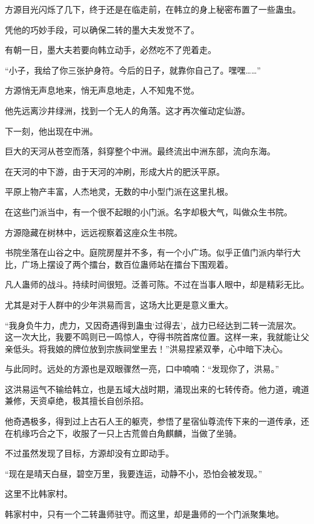 \begin{this_body}
方源目光闪烁了几下，终于还是在临走前，在韩立的身上秘密布置了一些蛊虫。

凭他的巧妙手段，可以确保二转的墨大夫发觉不了。

有朝一日，墨大夫若要向韩立动手，必然吃不了兜着走。

“小子，我给了你三张护身符。今后的日子，就靠你自己了。嘿嘿……”

方源悄无声息地来，悄无声息地走，人不知鬼不觉。

他先远离沙井绿洲，找到一个无人的角落。这才再次催动定仙游。

下一刻，他出现在中洲。

巨大的天河从苍空而落，斜穿整个中洲。最终流出中洲东部，流向东海。

在天河的中下游，由于天河的冲刷，形成大片的肥沃平原。

平原上物产丰富，人杰地灵，无数的中小型门派在这里扎根。

在这些门派当中，有一个很不起眼的小门派。名字却极大气，叫做众生书院。

方源隐藏在树林中，远远视察着这座众生书院。

书院坐落在山谷之中。庭院房屋并不多，有一个小广场。似乎正值门派内举行大比，广场上摆设了两个擂台，数百位蛊师站在擂台下围观着。

凡人蛊师的战斗。持续时间很短。泛善可陈。不过在当事人眼中，却是精彩无比。

尤其是对于人群中的少年洪易而言，这场大比更是意义重大。

“我身负牛力，虎力，又因奇遇得到蛊虫‘过得去’，战力已经达到二转一流层次。这一次大比，我要不鸣则已一鸣惊人，夺得书院首席位置。这样一来，我就能让父亲低头。将我娘的牌位放到宗族祠堂里去！”洪易捏紧双拳，心中暗下决心。

与此同时。远处的方源也是双眼骤然一亮，口中喃喃：“发现你了，洪易。”

这洪易运气不输给韩立，也是五域大战时期，涌现出来的七转传奇。他力道，魂道兼修，天资卓绝，极其擅长自创杀招。

他奇遇极多，得到过上古石人王的躯壳，参悟了星宿仙尊流传下来的一道传承，还在机缘巧合之下，收服了一只上古荒兽白角麒麟，当做了坐骑。

不过虽然发现了目标，方源却没有立即动手。

“现在是晴天白昼，碧空万里，我要连运，动静不小，恐怕会被发现。”

这里不比韩家村。

韩家村中，只有一个二转蛊师驻守。而这里，却是蛊师的一个门派聚集地。


\end{this_body}
